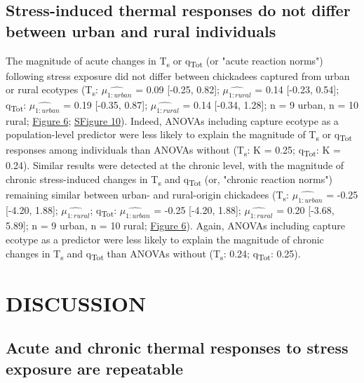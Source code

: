 \documentclass[12pt]{article}
\begin{document}
\subsection{Stress-induced thermal responses do not differ between urban and rural individuals}
\vspace{0.5cm}

\noindent The magnitude of acute changes in T\textsubscript{s} or q\textsubscript{Tot} (or "acute reaction norms") following stress exposure did not differ between chickadees captured from urban or rural ecotypes (T\textsubscript{s}: $\hat{\mu_{1:\mathit{urban}}}$ = 0.09 [-0.25, 0.82]; $\hat{\mu_{1:\mathit{rural}}}$ = 0.14 [-0.23, 0.54]; q\textsubscript{Tot}: $\hat{\mu_{1:\mathit{urban}}}$ = 0.19 [-0.35, 0.87]; $\hat{\mu_{1:\mathit{rural}}}$ = 0.14 [-0.34, 1.28]; n = 9 urban, n = 10 rural; \hyperref[Fig4.6]{Figure 6}; \hyperref[FigC.10]{SFigure 10}). Indeed, ANOVAs including capture ecotype as a population-level predictor were less likely to explain the magnitude of T\textsubscript{s} or q\textsubscript{Tot} responses among individuals than ANOVAs without (T\textsubscript{s}: K = 0.25; q\textsubscript{Tot}: K = 0.24). Similar results were detected at the chronic level, with the magnitude of chronic stress-induced changes in T\textsubscript{s} and q\textsubscript{Tot} (or, "chronic reaction norms") remaining similar between urban- and rural-origin chickadees (T\textsubscript{s}: $\hat{\mu_{1:\mathit{urban}}}$ = -0.25 [-4.20, 1.88]; $\hat{\mu_{1:\mathit{rural}}}$; q\textsubscript{Tot}: $\hat{\mu_{1:\mathit{urban}}}$ = -0.25 [-4.20, 1.88]; $\hat{\mu_{1:\mathit{rural}}}$ = 0.20 [-3.68, 5.89]; n = 9 urban, n = 10 rural; \hyperref[Fig4.6]{Figure 6}). Again, ANOVAs including capture ecotype as a predictor were less likely to explain the magnitude of chronic changes in T\textsubscript{s} and q\textsubscript{Tot} than ANOVAs without (T\textsubscript{s}: 0.24; q\textsubscript{Tot}: 0.25). 

\section{DISCUSSION}

\subsection{Acute and chronic thermal responses to stress exposure are repeatable}
\vspace{0.5cm}
\end{document}
